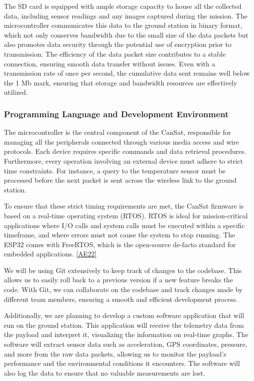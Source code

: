 The SD card is equipped with ample storage capacity to house all the collected data, including sensor readings and any images captured during the mission. The microcontroller communicates this data to the ground station in binary format, which not only conserves bandwidth due to the small size of the data packets but also promotes data security through the potential use of encryption prior to transmission. The efficiency of the data packet size contributes to a stable connection, ensuring smooth data transfer without issues. Even with a transmission rate of once per second, the cumulative data sent remains well below the 1 Mb mark, ensuring that storage and bandwidth resources are effectively utilized.

\subsubsection{Programming Language and Development Environment}

The microcontroller is the central component of the CanSat, responsible for managing all the peripherals connected through various media access and wire protocols. Each device requires specific commands and data retrieval procedures. Furthermore, every operation involving an external device must adhere to strict time constraints. For instance, a query to the temperature sensor must be processed before the next packet is sent across the wireless link to the ground station.

To ensure that these strict timing requirements are met, the CanSat firmware is based on a real-time operating system (RTOS). RTOS is ideal for mission-critical applications where I/O calls and system calls must be executed within a specific timeframe, and where errors must not cause the system to stop running. The ESP32 comes with FreeRTOS, which is the open-source de-facto standard for embedded applications. \ref{AE22}

We will be using Git extensively to keep track of changes to the codebase. This allows us to easily roll back to a previous version if a new feature breaks the code. With Git, we can collaborate on the codebase and track changes made by different team members, ensuring a smooth and efficient development process.



Additionally, we are planning to develop a custom software application that will run on the ground station. This application will receive the telemetry data from the payload and interpret it, visualizing the information on real-time graphs. The software will extract sensor data such as acceleration, GPS coordinates, pressure, and more from the raw data packets, allowing us to monitor the payload's performance and the environmental conditions it encounters. The software will also log the data to ensure that no valuable measurements are lost. 